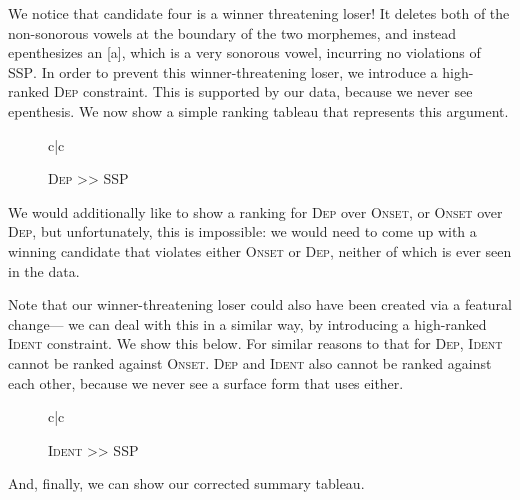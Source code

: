 \documentclass[12pt]{article}
\newcommand{\ident}{\textsc{Ident}}
\newcommand{\ssp}{\textsc{SSP}}
\newcommand{\dep}{\textsc{Dep}}
\newcommand{\onset}{\textsc{Onset}}
\begin{document}
We notice that candidate four is a winner threatening loser! It deletes both
of the non-sonorous vowels at the boundary of the two morphemes, and instead
epenthesizes an [a], which is a very sonorous vowel, incurring no violations of
\ssp. In order to prevent this winner-threatening loser, we introduce a
high-ranked \dep{} constraint. This is supported by our data, because we never
see epenthesis. We now show a simple ranking tableau that represents this argument.

\begin{figure}[h]
    \caption{\dep{} >> \ssp}
    \label{tableau:dep-wins}
    \begin{tableau}{c|c}
               \const{\dep} \const{\ssp}
         \vio{}       \vio{*****}
                   \vio{*!}     \vio{***}
    \end{tableau}
\end{figure}

We would additionally like to show a ranking for \dep{} over \onset, or
\onset{} over \dep, but unfortunately, this is impossible: we would need to
come up with a winning candidate that violates either \onset{} or \dep{},
neither of which is ever seen in the data.

Note that our winner-threatening loser could also have been created via a
featural change--- we can deal with this in a similar way, by introducing a
high-ranked \ident{} constraint. We show this below. For similar reasons to
that for \dep, \ident{} cannot be ranked against \onset. \dep{} and \ident{}
also cannot be ranked against each other, because we never see a surface
form that uses either.

\begin{figure}[h]
    \caption{\ident{} >> \ssp}
    \label{tableau:ident-wins}
    \begin{tableau}{c|c}
               \const{\ident} \const{\ssp}
         \vio{}         \vio{*****}
                   \vio{*!}       \vio{***}
    \end{tableau}
\end{figure}

And, finally, we can show our corrected summary tableau.
\end{document}
